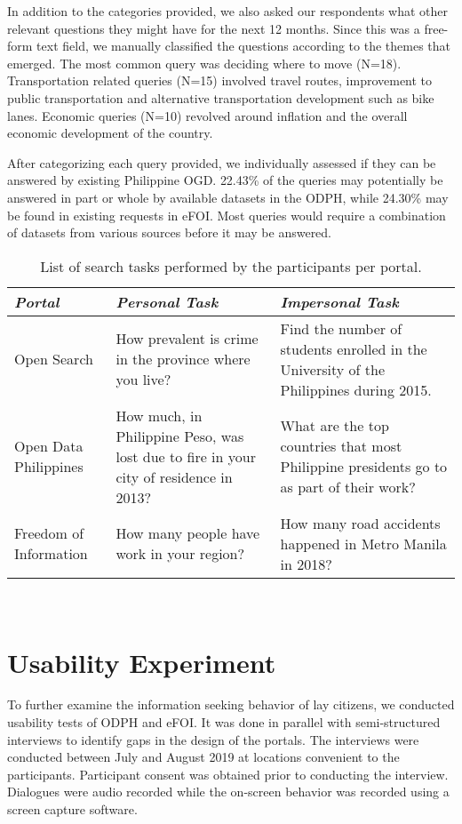 \documentclass{sigchi}
\begin{document}
In addition to the categories provided, we also asked our respondents what other relevant questions they might have for the next 12 months. Since this was a free-form text field, we manually classified the questions according to the themes that emerged. The most common query was deciding where to move (N=18). Transportation related queries (N=15) involved travel routes, improvement to public transportation and alternative transportation development such as bike lanes. Economic queries (N=10) revolved around inflation and the overall economic development of the country. 

After categorizing each query provided, we individually assessed if they can be answered by existing Philippine OGD. 22.43\% of the queries may potentially be answered in part or whole by available datasets in the ODPH, while 24.30\% may be found in existing requests in eFOI. Most queries would require a combination of datasets from various sources before it may be answered.

\begin{table*}[t]
  \centering
  \begin{tabular}{l p{5.2cm} p{5.2cm}}
    {\small\textit{Portal}}
    & {\small \textit{Personal Task}}
      & {\small \textit{Impersonal Task}}\\
    \midrule
    Open Search & How prevalent is crime in the province where you live? & Find the number of students enrolled in the University of the Philippines during 2015.\\
    Open Data Philippines & How much, in Philippine Peso,  was lost due to fire in your city of residence in 2013? & What are the top countries that most Philippine presidents go to as part of their work? \\
    Freedom of Information & How many people have work in your region? & How many road accidents happened in Metro Manila in 2018?
  \end{tabular}
  \caption{List of search tasks performed by the participants per portal.}~\label{tab:searchtasks}
\end{table*}

\section{Usability Experiment}
To further examine the information seeking behavior of lay citizens, we conducted usability tests of ODPH and eFOI. It was done in parallel with semi-structured interviews to identify gaps in the design of the portals. The interviews were conducted between July and August 2019 at locations convenient to the participants. Participant consent was obtained prior to conducting the interview. Dialogues were audio recorded while the on-screen behavior was recorded using a screen capture software. 
\end{document}
